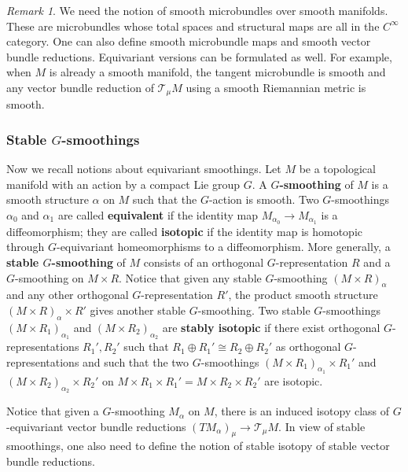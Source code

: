 \documentclass[reqno, 10pt]{amsart}
\numberwithin{equation}{section}
\numberwithin{equation}{section}
\theoremstyle{definition}
\theoremstyle{remark}
\newtheorem{rem}[thm]{Remark}
\newcommand{\ms}{\mathscr}
\begin{document}
\begin{rem}
We need the notion of smooth microbundles over smooth manifolds. These are microbundles whose total spaces and structural maps are all in the $C^\infty$ category. One can also define smooth microbundle maps and smooth vector bundle reductions. Equivariant versions can be formulated as well. For example, when $M$ is already a smooth manifold, the tangent microbundle is smooth and any vector bundle reduction of ${\ms T}_\mu M$ using a smooth Riemannian metric is smooth.
\end{rem}

\subsubsection{Stable $G$-smoothings}


Now we recall notions about equivariant smoothings. Let $M$ be a topological manifold with an action by a compact Lie group $G$. A {\bf $G$-smoothing} of $M$ is a smooth structure $\alpha$ on $M$ such that the $G$-action is smooth. Two $G$-smoothings $\alpha_0$ and $\alpha_1$ are called {\bf equivalent} if the identity map $M_{\alpha_0} \to M_{\alpha_1}$ is a diffeomorphism; they are called {\bf isotopic} if the identity map is homotopic through $G$-equivariant homeomorphisms to a diffeomorphism. More generally, a {\bf stable $G$-smoothing} of $M$ consists of an orthogonal $G$-representation $R$ and a $G$-smoothing on $M \times R$. Notice that given any stable $G$-smoothing $(M\times R)_\alpha$ and any other orthogonal $G$-representation $R'$, the product smooth structure $(M\times R)_\alpha \times R'$ gives another stable $G$-smoothing. Two stable $G$-smoothings $(M\times R_1)_{\alpha_1}$ and $(M \times R_2)_{\alpha_2}$ are {\bf stably isotopic} if there exist orthogonal $G$-representations $R_1', R_2'$ such that $R_1 \oplus R_1' \cong R_2 \oplus R_2'$ as orthogonal $G$-representations and such that the two $G$-smoothings $(M \times R_1)_{\alpha_1} \times R_1'$ and $(M\times R_2)_{\alpha_2} \times R_2'$ on $M \times R_1 \times R_1' = M\times R_2 \times R_2'$ are isotopic.

Notice that given a $G$-smoothing $M_\alpha$ on $M$, there is an induced isotopy class of $G$-equivariant vector bundle reductions $(TM_\alpha)_\mu \to {\ms T}_\mu M$. In view of stable smoothings, one also need to define the notion of stable isotopy of stable vector bundle reductions.
\end{document}
